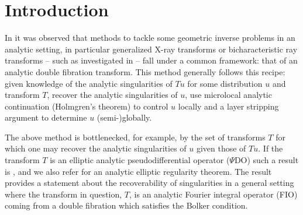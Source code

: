 \documentclass[
	fontsize=11pt, 
	twoside=false, 
	abstract=true, 
	a4paper,
]{scrartcl}
\newcommand{\abs}[1]{\left\lvert#1\right\rvert}
\newcommand{\dist}{\mathrm{dist}}
\begin{document}
%
%
%
%
%
%

\section{Introduction}

In \cite{2306.05906v1} it was observed that methods to tackle some geometric inverse problems in an analytic setting, in particular generalized X-ray transforms or bicharacteristic ray transforms -- such as investigated in \cite{zbMATH04052264,zbMATH06756133,MR3589324} -- fall under a common framework: that of an analytic double fibration transform. This method generally follows this recipe: given knowledge of the analytic singularities of $Tu$ for some distribution $u$ and transform $T$, recover the analytic singularities of $u$, use microlocal analytic continuation (Holmgren's theorem) to control $u$ locally and a layer stripping argument to determine $u$ (semi-)globally. 

The above method is bottlenecked, for example, by the set of transforms $T$ for which one may recover the analytic singularities of $u$ given those of $Tu$. If the transform $T$ is an elliptic analytic pseudodifferential operator ($\Psi$DO) such a result is \cite[Thm.~17.3.10]{MR4436039}, and we also refer \cite[Thm.~5.4]{zbMATH03359011} for an analytic elliptic regularity theorem. %
The result \cite[Thm.~5.1]{2306.05906v1} provides a statement about the recoverability of singularities in a general setting where the transform in question, $T$, is an analytic Fourier integral operator (FIO) coming from a double fibration which satisfies the Bolker condition.
\end{document}
